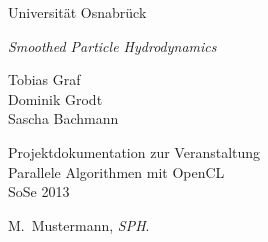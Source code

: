 \documentclass[a4paper,12pt,oneside]{amsbook}
\begin{document}
\begin{titlepage}
\begin{center}
{\large Universität Osnabrück}


\vspace{9em}
{\LARGE \emph{Smoothed Particle Hydrodynamics}}

\vspace{2em}
{\large Tobias Graf\\ Dominik Grodt\\ Sascha Bachmann}

\vspace{9em}
{\large Projektdokumentation zur Veranstaltung\\ Parallele Algorithmen mit OpenCL\\ SoSe 2013}



\end{center}
\end{titlepage}

\tableofcontents









\begin{thebibliography}{}

M.\ Mustermann,
{\em SPH}.

\end{thebibliography}
\end{document}
